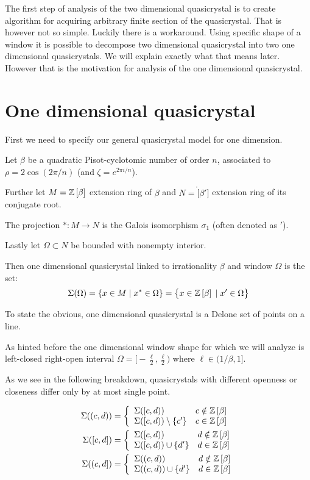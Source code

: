 \documentclass[text.tex]{subfiles}
\begin{document}
The first step of analysis of the two dimensional quasicrystal is to create algorithm for acquiring arbitrary finite section of the quasicrystal. That is however not so simple. Luckily there is a workaround. Using specific shape of a window it is possible to decompose two dimensional quasicrystal into two one dimensional quasicrystals. We will explain exactly what that means later. However that is the motivation for analysis of the one dimensional quasicrystal. 

\section{One dimensional quasicrystal}
First we need to specify our general quasicrystal model for one dimension. 

Let $\beta$ be a quadratic Pisot-cyclotomic number of order $n$, associated to $\rho = 2\cos\left(2\pi/n\right)$ (and $\zeta = e^{2\pi i/n}$). 

Further let $M = \mathbb{Z}\left[\beta\right]$ extension ring of $\beta$ and $N = \ring[\beta']$ extension ring of its conjugate root.

The projection $\ast:M\rightarrow N$ is the Galois isomorphism $\sigma_1$ (often denoted as $'$). 

Lastly let $\Omega\subset N$ be bounded with nonempty interior. 

Then one dimensional quasicrystal linked to irrationality $\beta$ and window $\Omega$ is the set:
$$\Sigma(\Omega) = \{ x \in M\; |\; x^\ast\in \Omega\} = \big\{ x \in \mathbb{Z}\left[\beta\right]\; |\; x'\in \Omega\big\}$$

To state the obvious, one dimensional quasicrystal is a Delone set of points on a line. 

As hinted before the one dimensional window shape for which we will analyze is left-closed right-open interval $\Omega = \big[-\frac{\ell}{2}, \frac{\ell}{2}\big)$ where $\ell\in (1/\beta,1]$. 

As we see in the following breakdown, quasicrystals with different openness or closeness differ only by at most single point. 

\begin{align*}
\Sigma((c,d)) &= \left\{ 
	\begin{array}{l l}
	\Sigma([c,d)) & c \notin \mathbb{Z}\left[\beta\right]\\
	\Sigma([c,d))\setminus\{c'\} & c \in \mathbb{Z}\left[\beta\right]
	\end{array} \right. 
  \\
  \Sigma([c,d]) &= \left\{ 
	\begin{array}{l l}
	\Sigma([c,d)) & d \notin \mathbb{Z}\left[\beta\right]\\
	\Sigma([c,d))\cup\{d'\} & d \in \mathbb{Z}\left[\beta\right]
	\end{array} \right.
  \\
\Sigma((c,d]) &= \left\{ 
	\begin{array}{l l}
	\Sigma((c,d)) & d \notin \mathbb{Z}\left[\beta\right]\\
	\Sigma((c,d))\cup\{d'\} & d \in \mathbb{Z}\left[\beta\right]
	\end{array} \right.\\
\end{align*}
\end{document}
